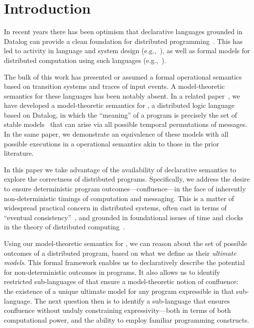 \section{Introduction}

In recent years there has been optimism that declarative languages grounded in
Datalog can provide a clean foundation for distributed
programming~\cite{declarative-imperative}.  This has led to activity in language
and system design (e.g.,~\cite{boom,Belaramani:2009,Chu:2007,Loo2009-CACM}), as well as formal
models for distributed computation using such
languages (e.g.,~\cite{relational-transducers,navarro-oper-sem,card-abstraction}).

The bulk of this work has presented or assumed a formal operational semantics based on transition systems
and traces of input events.  A model-theoretic semantics for these languages has been notably absent.
In a related paper~\cite{ameloot-operational}, we have developed a model-theoretic
semantics for \lang, a distributed logic language based on Datalog, in which the ``meaning''
of a program is precisely the set of stable models~\cite{sacca-zaniolo} that can arise via all possible temporal permutations of messages. %
In the same paper, we demonstrate an equivalence of these models with all possible executions in a operational semantics akin to those in the prior literature.

In this paper we take advantage of the availability of declarative semantics to explore the correctness of distributed programs.  Specifically, we address the desire to ensure deterministic program outcomes---confluence---in the face of inherently non-deterministic timings of computation and messaging.  This is a matter of widespread practical concern in distributed systems, often cast in terms of ``eventual consistency''~\cite{bayou,vogels-ec}, and grounded in foundational issues of time and clocks in the theory of distributed computing~\cite{timeclocks}.  

Using our model-theoretic semantics for
\lang, we can reason about the set of possible outcomes of a distributed program, based on what we define  as their \emph{ultimate models}.  This formal framework enables us to declaratively describe the potential for non-deterministic outcomes in \lang programs.  It also allows us to identify restricted sub-languages of \lang that ensure a model-theoretic notion of confluence: the existence of a unique ultimate model for any program expressible in that sub-language. The next question then is to identify a sub-language that ensures confluence without unduly constraining expressivity---both in terms of both computational power, and the ability to employ familiar programming constructs.

